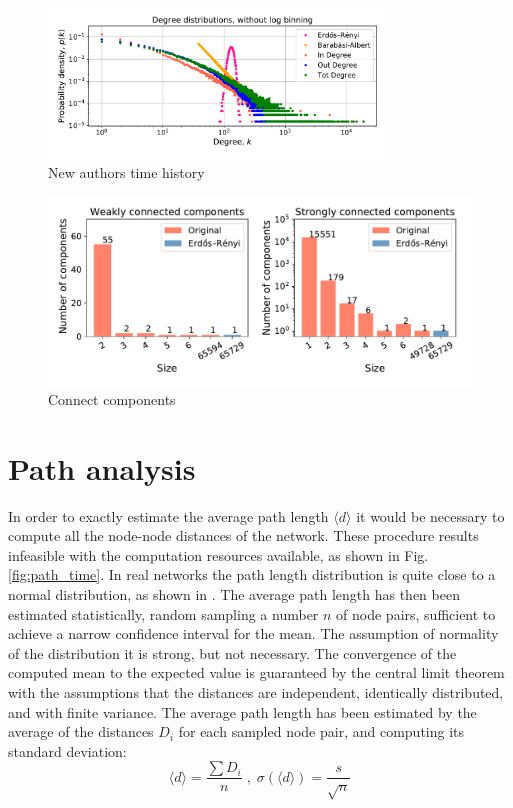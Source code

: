 \documentclass[11pt, twoside]{report}
\begin{document}
 \begin{figure}[htbp]
      \centering
      \includegraphics[width=0.8\textwidth]{../../scripts/network_analysis/imgs/degree_distributions_nobinlog.pdf}            
      \caption{New authors time history}
      \label{fig:degree}
    \end{figure}



    
    \begin{figure}[htbp]
      \centering
      \includegraphics[width=\textwidth]{../../scripts/network_analysis/imgs/connectivity.pdf}            
      \caption{Connect components}
      \label{fig:connectivity}
    \end{figure}


    \section{Path analysis}
    In order to exactly estimate the average path length $\langle d \rangle$ it would be necessary to compute all the node-node distances of the network. These procedure results infeasible with the computation resources available, as shown in Fig. \ref{fig:path_time}.
    In real networks the path length distribution is quite close to a normal distribution, as shown in \cite{ye_paths}. The average path length has then been estimated statistically, random sampling a number $n$ of node pairs, sufficient to achieve a narrow confidence interval for the mean. The assumption of normality of the distribution it is strong, but not necessary. The convergence of the computed mean to the expected value is guaranteed by the central limit theorem with the assumptions that the distances are independent, identically distributed, and with finite variance.
    The average path length has been estimated by the average of the distances $D_i$ for each sampled node pair, and computing its standard deviation:
    \begin{equation}
      \langle d \rangle = \frac{\sum D_i}{n} \; , \; \sigma(\langle d \rangle) = \frac{s}{\sqrt{n}}
    \end{equation}
\end{document}
